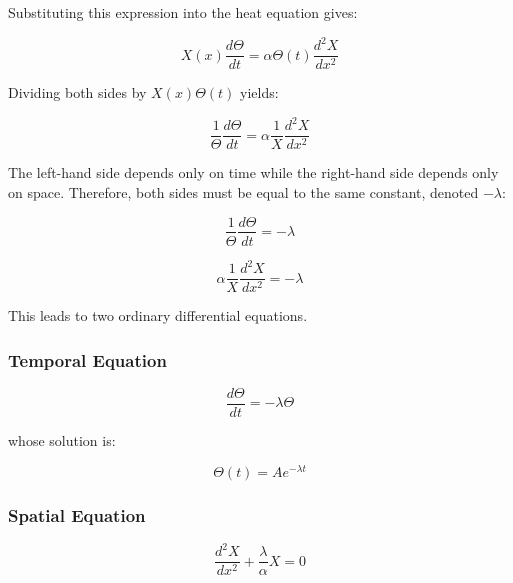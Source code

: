 Substituting this expression into the heat equation gives:

\begin{equation}
X(x)\frac{d\Theta}{dt}
=
\alpha
\Theta(t)\frac{d^2X}{dx^2}
\end{equation}

Dividing both sides by $X(x)\Theta(t)$ yields:

\begin{equation}
\frac{1}{\Theta}\frac{d\Theta}{dt}
=
\alpha
\frac{1}{X}\frac{d^2X}{dx^2}
\end{equation}

The left-hand side depends only on time while the right-hand side depends only on space. Therefore, both sides must be equal to the same constant, denoted $-\lambda$:

\begin{equation}
\frac{1}{\Theta}\frac{d\Theta}{dt}
=
-\lambda
\end{equation}

\begin{equation}
\alpha
\frac{1}{X}\frac{d^2X}{dx^2}
=
-\lambda
\end{equation}

This leads to two ordinary differential equations.

\subsubsection{Temporal Equation}

\begin{equation}
\frac{d\Theta}{dt}
=
-\lambda \Theta
\end{equation}

whose solution is:

\begin{equation}
\Theta(t)=Ae^{-\lambda t}
\end{equation}

\subsubsection{Spatial Equation}

\begin{equation}
\frac{d^2X}{dx^2}
+
\frac{\lambda}{\alpha}X
=
0
\end{equation}

